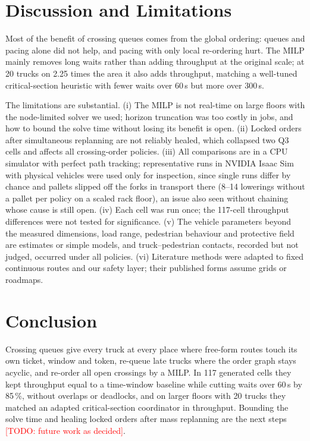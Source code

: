 \documentclass[conference]{IEEEtran}
\newcommand{\todo}[1]{\textcolor{red}{[TODO: #1]}}
\newcommand{\Qthree}{Q3}
\begin{document}
\section{Discussion and Limitations}

Most of the benefit of crossing queues comes from the global ordering: queues
and pacing alone did not help, and pacing with only local re-ordering hurt.
The MILP mainly removes long waits rather than adding throughput at the
original scale; at 20 trucks on 2.25 times the area it also adds throughput,
matching a well-tuned critical-section heuristic with fewer waits over 60\,s
but more over 300\,s.

The limitations are substantial. (i) The MILP is not real-time on large
floors with the node-limited solver we used; horizon truncation was too
costly in jobs, and how to bound the solve time without losing its benefit is
open. (ii) Locked orders after simultaneous replanning are not reliably
healed, which collapsed two \Qthree{} cells and affects all crossing-order
policies. (iii) All comparisons are in a CPU simulator with perfect path
tracking; representative runs in NVIDIA Isaac Sim with physical vehicles were
used only for inspection, since single runs differ by chance and pallets
slipped off the forks in transport there (8--14 lowerings without a pallet per
policy on a scaled rack floor), an issue also seen without chaining whose cause
is still open. (iv) Each cell was run once; the 117-cell throughput differences
were not tested for significance. (v) The vehicle parameters beyond the
measured dimensions, load range, pedestrian behaviour and protective field are
estimates or simple models, and truck--pedestrian contacts, recorded but not
judged, occurred under all policies. (vi) Literature methods were adapted to
fixed continuous routes and our safety layer; their published forms assume
grids or roadmaps.

\section{Conclusion}

Crossing queues give every truck at every place where free-form routes touch
its own ticket, window and token, re-queue late trucks where the order graph
stays acyclic, and re-order all open crossings by a MILP. In 117 generated
cells they kept throughput equal to a time-window baseline while cutting waits
over 60\,s by 85\,\%, without overlaps or deadlocks, and on larger floors with
20 trucks they matched an adapted critical-section coordinator in throughput.
Bounding the solve time and healing locked orders after mass replanning are the
next steps \todo{future work as decided}.



\end{document}
